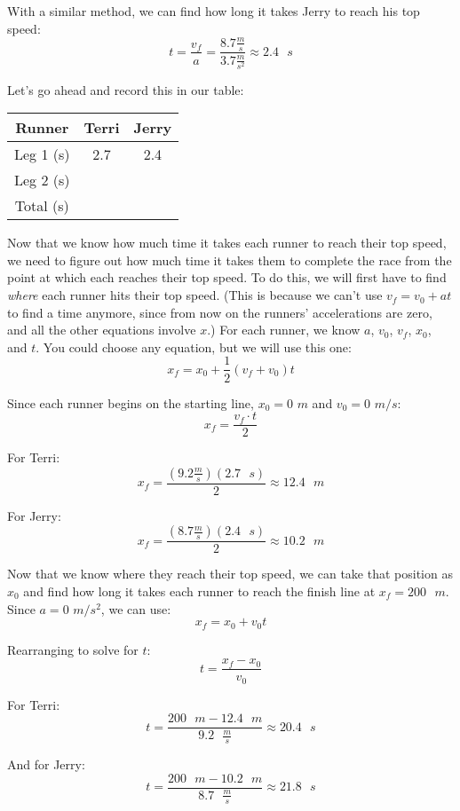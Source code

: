 With a similar method, we can find how long it takes Jerry to reach his top 
speed:
$$t = \frac{v_f}{a} = \frac{8.7 \frac{m}{s}}{3.7 \frac{m}{s^2}} \approx 2.4
\text{ }s$$

Let's go ahead and record this in our table:
\begin{center}
\begin{tabular}{|c|c|c|}
\hline
Runner & Terri & Jerry\\\hline
Leg 1 (s) & 2.7 & 2.4 \\\hline
Leg 2 (s) & & \\\hline
Total (s) & & \\\hline
\end{tabular}
\end{center}

Now that we know how much time it takes each runner to reach their top speed, we 
need to figure out how much time it takes them to complete the race from the 
point at which each reaches their top speed. To do this, we will first have to 
find \textit{where} each runner hits their top speed. (This is because we can't 
use $v_f = v_0 + at$ to find a time anymore, since from now on the runners' 
accelerations are zero, and all the other equations involve $x$.) For each 
runner, we know $a$, $v_0$, $v_f$, $x_0$, and $t$. You could choose any equation, 
but we will use this one:
$$x_f = x_0 + \frac{1}{2} \left( v_f + v_0 \right)t$$

Since each runner begins on the starting line, $x_0 = 0$ $m$ and $v_0 = 0$ $m/s$:
$$x_f = \frac{v_f \cdot t}{2}$$

For Terri:
$$x_f = \frac{\left(9.2 \frac{m}{s} \right) \left(2.7\text{ }s \right)}{2} 
\approx 12.4 \text{ }m$$

For Jerry:
$$x_f = \frac{\left( 8.7 \frac{m}{s} \right) \left( 2.4 \text{ }s \right)}{2} 
\approx 10.2 \text{ }m$$

Now that we know where they reach their top speed, we can take that position as 
$x_0$ and find how long it takes each runner to reach the finish line at $x_f = 
200\text{ }m$. Since $a = 0$ $m/s^2$, we can use:
$$x_f = x_0 + v_0 t$$

Rearranging to solve for $t$:
$$t = \frac{x_f - x_0}{v_0}$$

For Terri:
$$t = \frac{200 \text{ } m - 12.4 \text{ } m}{9.2 \text{ } \frac{m}{s}} \approx 
20.4\text{ }s$$

And for Jerry:
$$t = \frac{200 \text{ } m - 10.2 \text{ } m}{8.7 \text{ } \frac{m}{s}} \approx 
21.8 \text{ } s$$

